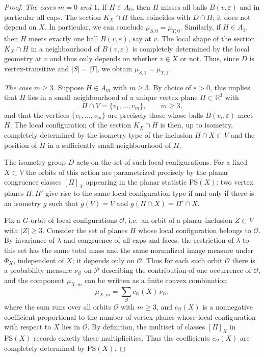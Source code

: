 \documentclass[10pt,a4paper]{amsart}
\begin{document}
\begin{proof}
\emph{The cases $m=0$ and $1$.}
If $H\in A_0$, then $H$ misses all balls $B(v,\varepsilon)$ and in particular all caps.
The section $K_X\cap H$ then coincides with $D\cap H$; it does not depend on $X$. In particular, we can conclude $\mu_{S,0} = \mu_{T,0}.$
Similarly, if $H\in A_1$, then $H$ meets exactly one ball $B(v,\varepsilon)$, say at $v$. The local
shape of the section $K_X\cap H$ in a neighbourhood of $B(v,\varepsilon)$ is completely
determined by the local geometry at $v$ and thus only depends on whether $v\in X$ or not. Thus, since $D$
is vertex-transitive and $|S|=|T|$, we obtain $\mu_{S,1} = \mu_{T,1}$.

\emph{The case $m\ge 3$.}
Suppose $H\in A_m$ with $m\ge 3$. By choice of $\varepsilon>0$, this implies that
$H$ lies in a small neighbourhood of a unique vertex plane
$\Pi\subset\mathbb{R}^3$ with
\[
\Pi\cap V = \{v_1,\dots,v_m\},\qquad m\ge 3,
\]
and that the vertices $\{v_1,\dots,v_m\}$ are precisely those whose balls
$B(v_i,\varepsilon)$ meet $H$. The local configuration of the section $K_X\cap H$ is then,
up to isometry, completely determined by the isometry type of the inclusion $\Pi\cap X \subset V$
and the position of $H$ in a sufficiently small neighbourhood of $\Pi$.

The isometry group $D$ acts on the set of such local configurations. For
a fixed $X \subset V$ the orbits of this action are parametrized precisely by
the planar congruence classes $[\Pi]_X$ appearing in the planar statistic
$\mathrm{PS}(X)$: two vertex planes $\Pi,\Pi'$ give rise to the same local
configuration type if and only if there is an isometry $g$ such that $g(V)=V$ and
$g(\Pi\cap X)=\Pi'\cap X$.

Fix a $G$-orbit of local configurations $\mathcal{O}$, i.e.\ an orbit of a planar inclusion $Z \subset V$ with $|Z|\ge 3$. Consider the set of planes $H$ whose local configuration belongs to $\mathcal{O}$. By
invariance of $\lambda$ and congruence of all caps and faces, the restriction of
$\lambda$ to this set has the same total mass and the same normalized image
measure under $\Phi_X$, independent of $X$; it depends only on $\mathcal{O}$.
Thus for each such orbit $\mathcal{O}$ there is a probability measure
$\nu_{\mathcal{O}}$ on $\mathcal{P}$ describing the contribution of one
occurrence of $\mathcal{O}$, and the component $\mu_{X,m}$ can be written as a
finite convex combination
\[
\mu_{X,m} = \sum_{\mathcal{O}} c_{\mathcal{O}}(X)\,\nu_{\mathcal{O}},
\]
where the sum runs over all orbits $\mathcal{O}$ with $m\ge 3$, and
$c_{\mathcal{O}}(X)$ is a nonnegative coefficient proportional to the number of
vertex planes whose local configuration with respect to $X$ lies in $\mathcal{O}$.
By definition, the multiset of classes $[\Pi]_X$ in $\mathrm{PS}(X)$ records
exactly these multiplicities. Thus the coefficients $c_{\mathcal{O}}(X)$ are
completely determined by $\mathrm{PS}(X)$.


\end{proof}
\end{document}

